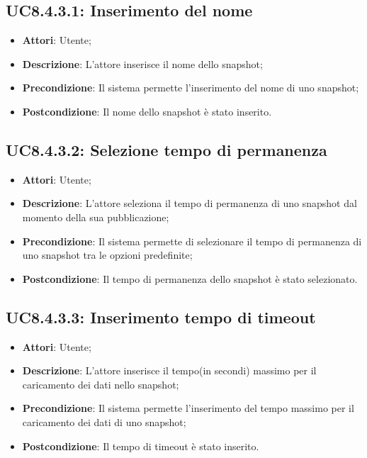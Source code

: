 \subsection{UC8.4.3.1: Inserimento del nome}
\hypertarget{UC8.4.3.1}{}
\begin{itemize}
	\item \textbf{Attori}: Utente;
	\item \textbf{Descrizione}: L'attore inserisce il nome dello snapshot;
	\item \textbf{Precondizione}: Il sistema permette l'inserimento del nome di uno snapshot;
	\item \textbf{Postcondizione}: Il nome dello snapshot è stato inserito.
\end{itemize}

\subsection{UC8.4.3.2: Selezione tempo di permanenza}
\hypertarget{UC8.4.3.2}{}
\begin{itemize}
	\item \textbf{Attori}: Utente;
	\item \textbf{Descrizione}: L'attore seleziona il tempo di permanenza di uno snapshot dal momento della sua pubblicazione;
	\item \textbf{Precondizione}: Il sistema permette di selezionare il tempo di permanenza di uno snapshot tra le opzioni predefinite;
	\item \textbf{Postcondizione}: Il tempo di permanenza dello snapshot è stato selezionato.
\end{itemize}

\subsection{UC8.4.3.3: Inserimento tempo di timeout}
\hypertarget{UC8.4.3.3}{}
\begin{itemize}
	\item \textbf{Attori}: Utente;
	\item \textbf{Descrizione}: L'attore inserisce il tempo(in secondi) massimo per il caricamento dei dati nello snapshot;
	\item \textbf{Precondizione}: Il sistema permette l'inserimento del tempo massimo per il caricamento dei dati di uno snapshot;
	\item \textbf{Postcondizione}: Il tempo di timeout è stato inserito.
\end{itemize}

\pagebreak




